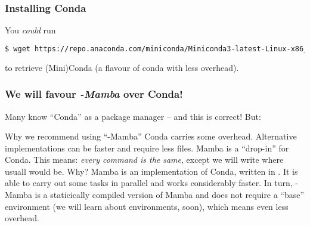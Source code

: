 \begin{frame}[fragile]
  \frametitle{Installing Conda}
  You \emph{could} run
  \begin{lstlisting}[language=Bash, style=Shell, basicstyle=\small,breaklines=true ]
$ wget https://repo.anaconda.com/miniconda/Miniconda3-latest-Linux-x86_64.sh
  \end{lstlisting}
  to retrieve (Mini)Conda (a flavour of conda with less overhead).
  \pause
\end{frame} 

\begin{frame}[fragile]
  \frametitle{We will favour \emph{\textmu-Mamba} over Conda!}
  Many know ``Conda'' as a package manager -- and this is correct! But:
  \begin{block}{Why we recommend using ``\textmu-Mamba''}
   Conda carries some overhead. Alternative implementations can be faster and require less files. Mamba is a ``drop-in'' for Conda. This means: \emph{every command is the same}, except we will write  where usuall  would be.\newline
   Why?\newline
   Mamba is an implementation of Conda, written in \CC{}. It is able to carry out some tasks in parallel and works considerably faster. In turn, \textmu-Mamba is a staticically compiled version of Mamba and does not require a ``base'' environment (we will learn about environments, soon), which means even less overhead.
  \end{block}
\end{frame}


